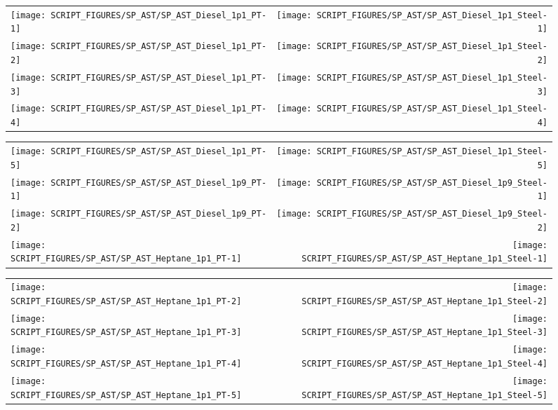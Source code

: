 \begin{figure}[p]
\begin{tabular*}{\textwidth}{l@{\extracolsep{\fill}}r}
\texttt{[image: SCRIPT\_FIGURES/SP\_AST/SP\_AST\_Diesel\_1p1\_PT-1]}  &  \texttt{[image: SCRIPT\_FIGURES/SP\_AST/SP\_AST\_Diesel\_1p1\_Steel-1]}    \\
\texttt{[image: SCRIPT\_FIGURES/SP\_AST/SP\_AST\_Diesel\_1p1\_PT-2]}  &  \texttt{[image: SCRIPT\_FIGURES/SP\_AST/SP\_AST\_Diesel\_1p1\_Steel-2]}    \\
\texttt{[image: SCRIPT\_FIGURES/SP\_AST/SP\_AST\_Diesel\_1p1\_PT-3]}  &  \texttt{[image: SCRIPT\_FIGURES/SP\_AST/SP\_AST\_Diesel\_1p1\_Steel-3]}    \\
\texttt{[image: SCRIPT\_FIGURES/SP\_AST/SP\_AST\_Diesel\_1p1\_PT-4]}  &  \texttt{[image: SCRIPT\_FIGURES/SP\_AST/SP\_AST\_Diesel\_1p1\_Steel-4]}
\end{tabular*}
\label{SP_Diesel_1p1_PT_Steel}
\end{figure}

\begin{figure}[p]
\begin{tabular*}{\textwidth}{l@{\extracolsep{\fill}}r}
\texttt{[image: SCRIPT\_FIGURES/SP\_AST/SP\_AST\_Diesel\_1p1\_PT-5]}  &  \texttt{[image: SCRIPT\_FIGURES/SP\_AST/SP\_AST\_Diesel\_1p1\_Steel-5]}   \\
\texttt{[image: SCRIPT\_FIGURES/SP\_AST/SP\_AST\_Diesel\_1p9\_PT-1]}  &  \texttt{[image: SCRIPT\_FIGURES/SP\_AST/SP\_AST\_Diesel\_1p9\_Steel-1]}   \\
\texttt{[image: SCRIPT\_FIGURES/SP\_AST/SP\_AST\_Diesel\_1p9\_PT-2]}  &  \texttt{[image: SCRIPT\_FIGURES/SP\_AST/SP\_AST\_Diesel\_1p9\_Steel-2]}   \\
\texttt{[image: SCRIPT\_FIGURES/SP\_AST/SP\_AST\_Heptane\_1p1\_PT-1]} &  \texttt{[image: SCRIPT\_FIGURES/SP\_AST/SP\_AST\_Heptane\_1p1\_Steel-1]}  
\end{tabular*}
\label{SP_Diesel_1p9_PT_Steel}
\end{figure}

\begin{figure}[p]
\begin{tabular*}{\textwidth}{l@{\extracolsep{\fill}}r}
\texttt{[image: SCRIPT\_FIGURES/SP\_AST/SP\_AST\_Heptane\_1p1\_PT-2]} &  \texttt{[image: SCRIPT\_FIGURES/SP\_AST/SP\_AST\_Heptane\_1p1\_Steel-2]}  \\
\texttt{[image: SCRIPT\_FIGURES/SP\_AST/SP\_AST\_Heptane\_1p1\_PT-3]} &  \texttt{[image: SCRIPT\_FIGURES/SP\_AST/SP\_AST\_Heptane\_1p1\_Steel-3]}  \\
\texttt{[image: SCRIPT\_FIGURES/SP\_AST/SP\_AST\_Heptane\_1p1\_PT-4]} &  \texttt{[image: SCRIPT\_FIGURES/SP\_AST/SP\_AST\_Heptane\_1p1\_Steel-4]}  \\
\texttt{[image: SCRIPT\_FIGURES/SP\_AST/SP\_AST\_Heptane\_1p1\_PT-5]} &  \texttt{[image: SCRIPT\_FIGURES/SP\_AST/SP\_AST\_Heptane\_1p1\_Steel-5]}  
\end{tabular*}
\label{SP_Heptane_1p1_PT_Steel}
\end{figure}

